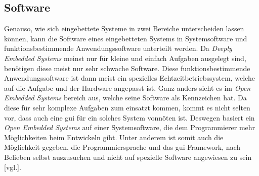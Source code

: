 \subsection{Software}
\label{subsec:EmbeddedSoftware}
Genauso, wie sich eingebettete Systeme in zwei Bereiche unterscheiden lassen können, kann die
Software eines eingebetteten Systems in Systemsoftware und funktionsbestimmende
Anwendungssoftware unterteilt werden. Da \emph{Deeply Embedded Systems} meinst nur für kleine und
einfach Aufgaben ausgelegt sind, benötigen diese meist nur sehr schwache Software. Diese
funktionsbestimmende Anwendungssoftware ist dann meist ein spezielles Echtzeitbetriebssystem,
welche auf die Aufgabe und der Hardware angepasst ist.
\newline
\newline
Ganz anders sieht es im \emph{Open Embedded Systems} bereich aus, welche seine Software als
Kennzeichen hat. Da diese für sehr komplexe Aufgaben zum einsatzt kommen, kommt es nicht selten
vor, dass auch eine \ac{gui} für ein solches System vonnöten ist. Deswegen basiert ein \emph{Open
Embedded Systems} auf einer Systemsoftware, die dem Programmierer mehr Möglichkeiten beim
Entwickeln gibt. Unter anderem ist somit auch die Möglichkeit gegeben, die Programmiersprache und
das \ac{gui}-Framework, nach Belieben selbst auszusuchen und nicht auf spezielle Software angewiesen
zu sein \cite{EmbeddedLinuxQuade}[vgl.].